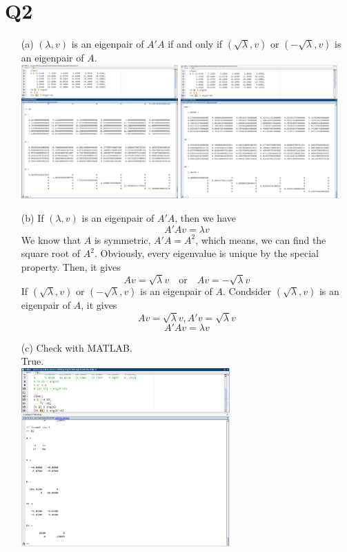 \documentclass{article}
\begin{document}
\section*{Q2}
    \begin{itemize}
        \item[(a)]
        $(\lambda, v)$ is an eigenpair of $A'A$ if and only if $(\sqrt{\lambda}, v)$ or $(-\sqrt{\lambda}, v)$ is an eigenpair of $A$.\\
            \includegraphics[width=6cm]{a1.png}
            \includegraphics[width=6cm]{a2.png}
        \item[(b)]
        If $(\lambda, v)$ is an eigenpair of $A'A$, then we have
        $$A'Av = \lambda v$$
        We know that $A$ is symmetric, $A'A = A^2$, which means, we can find the square root of $A^2$. Obviously, every eigenvalue is unique by the special property. Then, it gives
        $$Av = \sqrt{\lambda}v \quad\text{or}\quad Av = -\sqrt{\lambda}v$$
        If $(\sqrt{\lambda}, v)$ or $(-\sqrt{\lambda}, v)$ is an eigenpair of $A$. Condsider $(\sqrt{\lambda}, v)$ is an eigenpair of $A$, it gives
        $$Av = \sqrt{\lambda}v, A'v = \sqrt{\lambda}v$$
        $$A'Av = \lambda v$$
        \item[(c)]
        Check with MATLAB.\\
        True.\\
        \includegraphics[width=8cm]{c.png}

\end{itemize}
\end{document}
